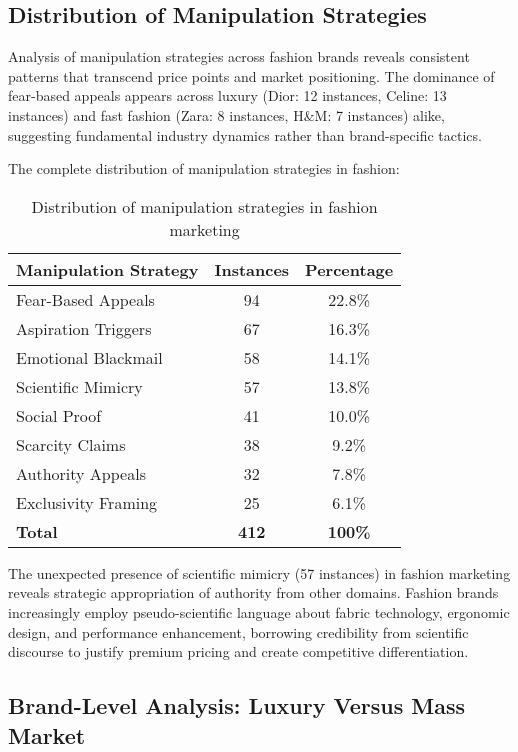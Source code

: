 \subsection{Distribution of Manipulation Strategies}

Analysis of manipulation strategies across fashion brands reveals consistent patterns that transcend price points and market positioning. The dominance of fear-based appeals appears across luxury (Dior: 12 instances, Celine: 13 instances) and fast fashion (Zara: 8 instances, H&M: 7 instances) alike, suggesting fundamental industry dynamics rather than brand-specific tactics.

The complete distribution of manipulation strategies in fashion:

\begin{table}[h]
\centering
\begin{tabular}{|l|c|c|}
\hline
\textbf{Manipulation Strategy} & \textbf{Instances} & \textbf{Percentage} \\
\hline
Fear-Based Appeals & 94 & 22.8\% \\
Aspiration Triggers & 67 & 16.3\% \\
Emotional Blackmail & 58 & 14.1\% \\
Scientific Mimicry & 57 & 13.8\% \\
Social Proof & 41 & 10.0\% \\
Scarcity Claims & 38 & 9.2\% \\
Authority Appeals & 32 & 7.8\% \\
Exclusivity Framing & 25 & 6.1\% \\
\hline
\textbf{Total} & \textbf{412} & \textbf{100\%} \\
\hline
\end{tabular}
\caption{Distribution of manipulation strategies in fashion marketing}
\end{table}

The unexpected presence of scientific mimicry (57 instances) in fashion marketing reveals strategic appropriation of authority from other domains. Fashion brands increasingly employ pseudo-scientific language about fabric technology, ergonomic design, and performance enhancement, borrowing credibility from scientific discourse to justify premium pricing and create competitive differentiation.

\subsection{Brand-Level Analysis: Luxury Versus Mass Market}


